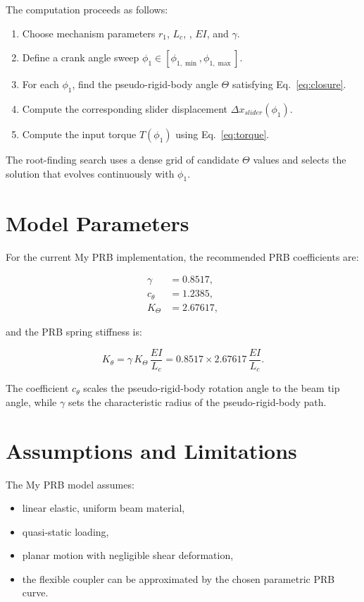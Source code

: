 \documentclass[11pt]{article}
\begin{document}
The computation proceeds as follows:

\begin{enumerate}
  \item Choose mechanism parameters $r_1$, $L_c$, , $EI$, and $\gamma$.
  \item Define a crank angle sweep $\phi_1 \in [\phi_{1,\min}, \phi_{1,\max}]$.
  \item For each $\phi_1$, find the pseudo-rigid-body angle $\Theta$ satisfying Eq.~\eqref{eq:closure}.
  \item Compute the corresponding slider displacement $\Delta x_{slider}(\phi_1)$.
  \item Compute the input torque $T(\phi_1)$ using Eq.~\eqref{eq:torque}.
\end{enumerate}

The root-finding search uses a dense grid of candidate $\Theta$ values and selects the solution that evolves continuously with $\phi_1$.

\section{Model Parameters}

For the current My PRB implementation, the recommended PRB coefficients are:

\begin{align}
    \gamma &= 0.8517, \\
    c_{\theta} &= 1.2385, \\
    K_{\Theta} &= 2.67617,
\end{align}

and the PRB spring stiffness is:

\begin{equation}
    K_{\theta} = \gamma \, K_{\Theta} \, \frac{EI}{L_c} = 0.8517 \times 2.67617 \, \frac{EI}{L_c}.
\end{equation}

The coefficient $c_{\theta}$ scales the pseudo-rigid-body rotation angle to the beam tip angle, while $\gamma$ sets the characteristic radius of the pseudo-rigid-body path.

\section{Assumptions and Limitations}

The My PRB model assumes:

\begin{itemize}
  \item linear elastic, uniform beam material,
  \item quasi-static loading,
  \item planar motion with negligible shear deformation,
  \item the flexible coupler can be approximated by the chosen parametric PRB curve.
\end{itemize}
\end{document}
